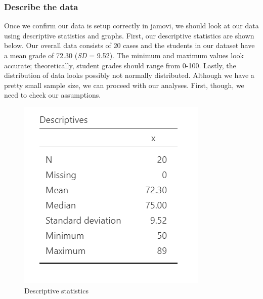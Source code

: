 \documentclass[
]{book}
\begin{document}
\hypertarget{describe-the-data}{%
\subsubsection{Describe the data}\label{describe-the-data}}

Once we confirm our data is setup correctly in jamovi, we should look at our data using descriptive statistics and graphs. First, our descriptive statistics are shown below. Our overall data consists of 20 cases and the students in our dataset have a mean grade of 72.30 (\emph{SD} = 9.52). The minimum and maximum values look accurate; theoretically, student grades should range from 0-100. Lastly, the distribution of data looks possibly not normally distributed. Although we have a pretty small sample size, we can proceed with our analyses. First, though, we need to check our assumptions.

\begin{figure}

{\centering \includegraphics[width=0.8\linewidth]{images/07.1-one_sample_t-test/descriptives} 

}

\caption{Descriptive statistics}\label{fig:unnamed-chunk-2}
\end{figure}
\end{document}
